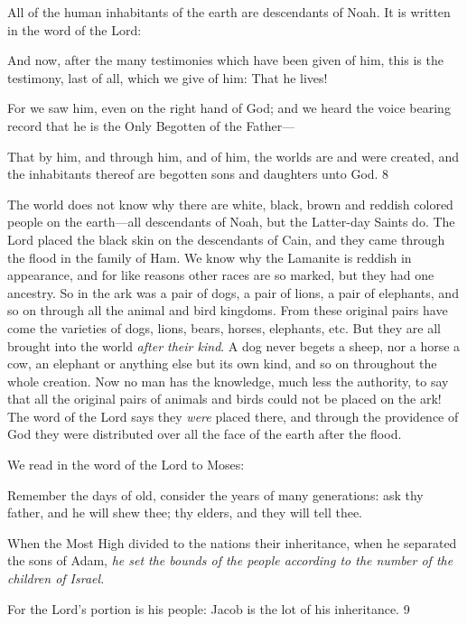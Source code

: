 All of the human inhabitants of the earth are descendants of Noah. It is written in the word of
the Lord:

And now, after the many testimonies which have been given of him, this is the testimony,
last of all, which we give of him: That he lives!

For we saw him, even on the right hand of God; and we heard the voice bearing record that
he is the Only Begotten of the Father—

That by him, and through him, and of him, the worlds are and were created, and the
inhabitants thereof are begotten sons and daughters unto God. 8

The world does not know why there are white, black, brown and reddish colored people on
the earth—all descendants of Noah, but the Latter-day Saints do. The Lord placed the black
skin on the descendants of Cain, and they came through the flood in the family of Ham. We
know why the Lamanite is reddish in appearance, and for like reasons other races are so
marked, but they had one ancestry. So in the ark was a pair of dogs, a pair of lions, a pair of
elephants, and so on through all the animal and bird kingdoms. From these original pairs
have come the varieties of dogs, lions, bears, horses, elephants, etc. But they are all brought
into the world \textit{after their kind}. A dog never begets a sheep, nor a horse a cow, an elephant or
anything else but its own kind, and so on throughout the whole creation. Now no man has the
knowledge, much less the authority, to say that all the original pairs of animals and birds
could not be placed on the ark! The word of the Lord says they \textit{were} placed there, and
through the providence of God they were distributed over all the face of the earth after the
flood.

We read in the word of the Lord to Moses:

Remember the days of old, consider the years of many generations: ask thy father, and he
will shew thee; thy elders, and they will tell thee.

When the Most High divided to the nations their inheritance, when he separated the sons of
Adam, \textit{he set the bounds of the people according to the number of the children of Israel.}

For the Lord's portion is his people: Jacob is the lot of his inheritance. 9

